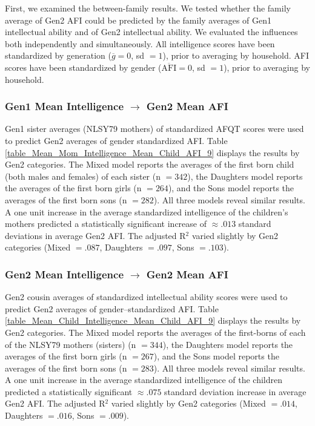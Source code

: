 First, we examined the between-family results. We tested whether the family average of Gen2 AFI could be predicted by the family averages of Gen1 intellectual ability and of Gen2 intellectual ability. We evaluated the influences both independently and simultaneously. All intelligence scores have been standardized by generation ($\overline{g} = 0$, sd $= 1$), prior to averaging by household. AFI scores have been standardized by gender ($\overline{\mathrm{AFI}} = 0$, sd $= 1$), prior to averaging by household.

\subsubsection{Gen1 Mean Intelligence $\rightarrow$ Gen2 Mean AFI} Gen1 sister averages (NLSY79 mothers) of standardized AFQT scores were used to predict Gen2 averages of gender standardized AFI. Table \ref{table_Mean_Mom_Intelligence_Mean_Child_AFI_9} displays the results by Gen2 categories. The Mixed model reports the averages of the first born child (both males and females) of each sister (n $= 342$), the Daughters model reports the averages of the first born girls (n $= 264$), and the Sons model reports the averages of the first born sons (n $= 282$). All three models reveal similar results. A one unit increase in the average standardized intelligence of the children's mothers predicted a statistically significant increase of $\approx .013$ standard deviations in average Gen2 AFI. The adjusted R$^{2}$ varied slightly by Gen2 categories (Mixed $= .087$, Daughters $= .097$, Sons $= .103$).

\subsubsection{Gen2 Mean Intelligence $\rightarrow$ Gen2 Mean AFI} Gen2 cousin averages of standardized intellectual ability scores were used to predict Gen2 averages of gender--standardized AFI. Table \ref{table_Mean_Child_Intelligence_Mean_Child_AFI_9} displays the results by Gen2 categories. The Mixed model reports the averages of the first-borns of each of the NLSY79 mothers (sisters) (n $= 344$), the Daughters model reports the averages of the first born girls (n $= 267$), and the Sons model reports the averages of the first born sons (n $= 283$). All three models reveal similar results. A one unit increase in the average standardized intelligence of the children predicted a statistically significant $\approx .075$ standard deviation increase in average Gen2 AFI. The adjusted R$^{2}$ varied slightly by Gen2 categories (Mixed $= .014$, Daughters $= .016$, Sons $= .009$). 

